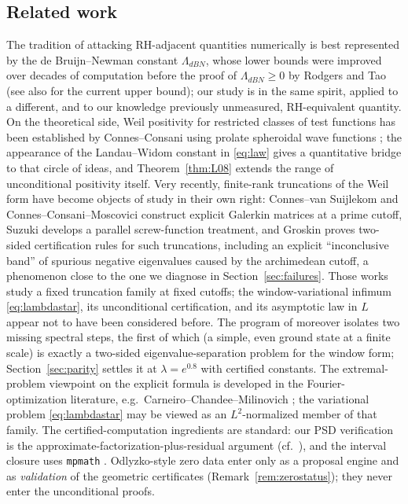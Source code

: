 ﻿\documentclass[11pt]{article}
\begin{document}
\subsection{Related work}

The tradition of attacking RH-adjacent quantities numerically is best
represented by the de Bruijn--Newman constant $\Lambda_{dBN}$, whose
lower bounds were improved over decades of computation before the
proof of $\Lambda_{dBN}\ge0$ by Rodgers and Tao \cite{RodgersTao2020}
(see also \cite{Polymath15} for the current upper bound); our study is
in the same spirit, applied to a different, and to our knowledge
previously unmeasured, RH-equivalent quantity.  On the theoretical
side, Weil positivity for restricted classes of test functions has
been established by Connes--Consani using prolate spheroidal wave
functions \cite{ConnesConsani2021}; the appearance of the
Landau--Widom constant in \eqref{eq:law} gives a quantitative bridge
to that circle of ideas, and Theorem~\ref{thm:L08}
extends the range of unconditional positivity itself.  Very recently,
finite-rank truncations of the Weil form have become objects of
study in their own right: Connes--van Suijlekom
\cite{ConnesVanSuijlekom2025} and Connes--Consani--Moscovici
\cite{CCMZeta2025} construct explicit Galerkin matrices at a prime
cutoff, Suzuki \cite{Suzuki2026} develops a parallel screw-function
treatment, and Groskin \cite{Groskin2026} proves two-sided
certification rules for such truncations, including an explicit
``inconclusive band'' of spurious negative eigenvalues caused by the
archimedean cutoff, a phenomenon close to the one we diagnose in
Section~\ref{sec:failures}.  Those works study a fixed
truncation family at fixed cutoffs; the window-variational infimum
\eqref{eq:lambdastar}, its unconditional certification, and its
asymptotic law in $L$ appear not to have been considered before.
The program of \cite{CCMZeta2025} moreover isolates two missing
spectral steps, the first of which (a simple, even ground state at a
finite scale) is exactly a two-sided eigenvalue-separation problem for
the window form; Section~\ref{sec:parity} settles it at $\lambda=e^{0.8}$
with certified constants.  The
extremal-problem viewpoint on the explicit formula is developed in the
Fourier-optimization literature, e.g.\
Carneiro--Chandee--Milinovich \cite{CCM2013}; the variational problem
\eqref{eq:lambdastar} may be viewed as an $L^2$-normalized member of
that family.  The certified-computation ingredients are standard: our
PSD verification is the approximate-factorization-plus-residual
argument (cf.\ \cite{Rump2010}), and the interval closure uses
\texttt{mpmath} \cite{mpmath}.  Odlyzko-style zero data enter only as a proposal engine and as
\emph{validation} of the geometric certificates
(Remark~\ref{rem:zerostatus}); they never enter the unconditional
proofs.
\end{document}
